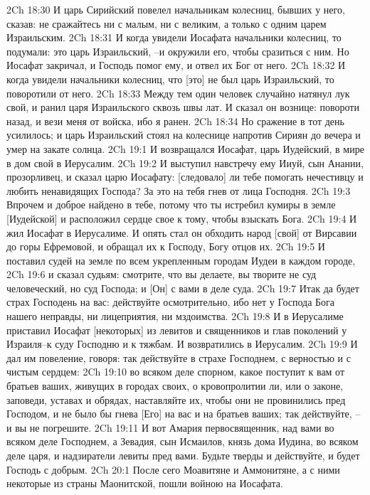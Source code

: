 2Ch 18:30  И царь Сирийский повелел начальникам колесниц, бывших у него, сказав: не сражайтесь ни с малым, ни с великим, а только с одним царем Израильским.
2Ch 18:31  И когда увидели Иосафата начальники колесниц, то подумали: это царь Израильский, --и окружили его, чтобы сразиться с ним. Но Иосафат закричал, и Господь помог ему, и отвел их Бог от него.
2Ch 18:32  И когда увидели начальники колесниц, что [это] не был царь Израильский, то поворотили от него.
2Ch 18:33  Между тем один человек случайно натянул лук свой, и ранил царя Израильского сквозь швы лат. И сказал он вознице: повороти назад, и вези меня от войска, ибо я ранен.
2Ch 18:34  Но сражение в тот день усилилось; и царь Израильский стоял на колеснице напротив Сириян до вечера и умер на закате солнца.
2Ch 19:1  И возвращался Иосафат, царь Иудейский, в мире в дом свой в Иерусалим.
2Ch 19:2  И выступил навстречу ему Ииуй, сын Анании, прозорливец, и сказал царю Иосафату: [следовало] ли тебе помогать нечестивцу и любить ненавидящих Господа? За это на тебя гнев от лица Господня.
2Ch 19:3  Впрочем и доброе найдено в тебе, потому что ты истребил кумиры в земле [Иудейской] и расположил сердце свое к тому, чтобы взыскать Бога.
2Ch 19:4  И жил Иосафат в Иерусалиме. И опять стал он обходить народ [свой] от Вирсавии до горы Ефремовой, и обращал их к Господу, Богу отцов их.
2Ch 19:5  И поставил судей на земле по всем укрепленным городам Иудеи в каждом городе,
2Ch 19:6  и сказал судьям: смотрите, что вы делаете, вы творите не суд человеческий, но суд Господа; и [Он] с вами в деле суда.
2Ch 19:7  Итак да будет страх Господень на вас: действуйте осмотрительно, ибо нет у Господа Бога нашего неправды, ни лицеприятия, ни мздоимства.
2Ch 19:8  И в Иерусалиме приставил Иосафат [некоторых] из левитов и священников и глав поколений у Израиля--к суду Господню и к тяжбам. И возвратились в Иерусалим.
2Ch 19:9  И дал им повеление, говоря: так действуйте в страхе Господнем, с верностью и с чистым сердцем:
2Ch 19:10  во всяком деле спорном, какое поступит к вам от братьев ваших, живущих в городах своих, о кровопролитии ли, или о законе, заповеди, уставах и обрядах, наставляйте их, чтобы они не провинились пред Господом, и не было бы гнева [Его] на вас и на братьев ваших; так действуйте, --и вы не погрешите.
2Ch 19:11  И вот Амария первосвященник, над вами во всяком деле Господнем, а Зевадия, сын Исмаилов, князь дома Иудина, во всяком деле царя, и надзиратели левиты пред вами. Будьте тверды и действуйте, и будет Господь с добрым.
2Ch 20:1  После сего Моавитяне и Аммонитяне, а с ними некоторые из страны Маонитской, пошли войною на Иосафата.
